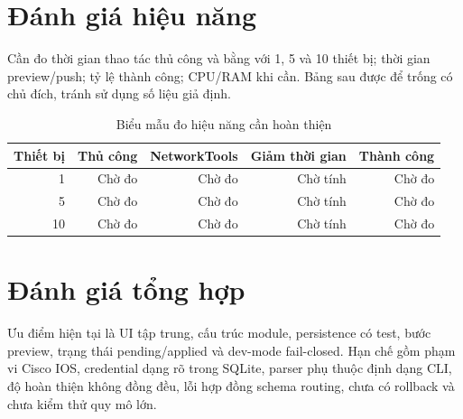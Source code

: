 \section{Đánh giá hiệu năng}

Cần đo thời gian thao tác thủ công và bằng \SoftwareName{} với 1, 5 và 10 thiết bị; thời gian preview/push; tỷ lệ thành công; CPU/RAM khi cần. Bảng sau được để trống có chủ đích, tránh sử dụng số liệu giả định.

\begin{table}[H]
\centering
\caption{Biểu mẫu đo hiệu năng cần hoàn thiện}
\label{tab:performance-template}
\begin{tabular}{r r r r r}
\toprule
Thiết bị & Thủ công & NetworkTools & Giảm thời gian & Thành công \\
\midrule
1 & Chờ đo & Chờ đo & Chờ tính & Chờ đo \\
5 & Chờ đo & Chờ đo & Chờ tính & Chờ đo \\
10 & Chờ đo & Chờ đo & Chờ tính & Chờ đo \\
\bottomrule
\end{tabular}
\end{table}

\section{Đánh giá tổng hợp}

Ưu điểm hiện tại là UI tập trung, cấu trúc module, persistence có test, bước preview, trạng thái pending/applied và dev-mode fail-closed. Hạn chế gồm phạm vi Cisco IOS, credential dạng rõ trong SQLite, parser phụ thuộc định dạng CLI, độ hoàn thiện không đồng đều, lỗi hợp đồng schema routing, chưa có rollback và chưa kiểm thử quy mô lớn.

